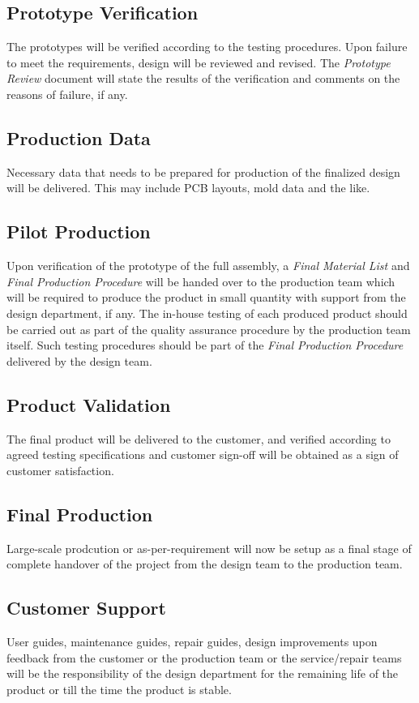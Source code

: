 \documentclass[a4paper,10pt]{article}
\begin{document}
\subsection{Prototype Verification}
The prototypes will be verified according to the testing procedures. Upon failure to meet the requirements, design will be reviewed and revised.
The \emph{Prototype Review} document will state the results of the verification and comments on the reasons of failure, if any.

\subsection{Production Data}
Necessary data that needs to be prepared for production of the finalized design will be delivered. This may include PCB layouts, mold data and the like.


\subsection{Pilot Production}
Upon verification of the prototype of the full assembly, a \emph{Final Material List} and \emph{Final Production Procedure} 
will be handed over to the production team which will be required to produce the product in small quantity with support from the design department,
if any. The in-house testing of each produced product should be carried out as part of the quality assurance procedure by 
the production team itself. Such testing procedures should be part of the \emph{Final Production Procedure} delivered by the design team.

\subsection{Product Validation}
The final product will be delivered to the customer, and verified according to agreed testing specifications and customer sign-off will be obtained as a
sign of customer satisfaction. 

\subsection{Final Production}
Large-scale prodcution or as-per-requirement will now be setup as a final stage of complete handover of the project from the design team to the
production team.

\subsection{Customer Support}
User guides, maintenance guides, repair guides, design improvements upon feedback from the customer or the production team or the service/repair teams
will be the responsibility of the design department for the remaining life of the product or till the time the product is stable.
\end{document}
